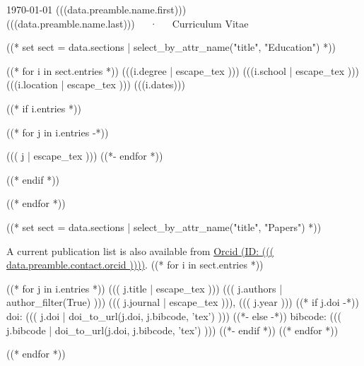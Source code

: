 \documentclass[10pt, letterpaper]{awesome-cv}
\begin{document}
\makecvheader

\makecvfooter
  {\today}
  {(((data.preamble.name.first))) (((data.preamble.name.last)))~~~·~~~Curriculum Vitae}
  {\thepage}



((* set sect = data.sections | select_by_attr_name("title", "Education") *))
\begin{cventries}
((* for i in sect.entries *))
\cventry
  {(((i.degree | escape_tex )))}
  {(((i.school | escape_tex )))}
  {(((i.location | escape_tex )))}
  {(((i.dates)))}
  {((* if i.entries *))
    \begin{cvitems}
    ((* for j in i.entries -*))
    \item ((( j | escape_tex )))
    ((*- endfor *))
    \end{cvitems}
    ((* endif *))}
((* endfor *))
\end{cventries}

((* set  sect = data.sections | select_by_attr_name("title", "Papers") *))

A current publication list is also available from 
\href{https://orcid.org/((( data.preamble.contact.orcid )))}
     {Orcid (ID: ((( data.preamble.contact.orcid ))))}.
((* for i in sect.entries *))
\begin{cventries}
((* for j in i.entries *))
\cventry
  {((( j.title | escape_tex )))}
  {((( j.authors | author_filter(True) )))}
  {((( j.journal | escape_tex ))), ((( j.year )))}
  ((* if j.doi -*))
  {doi: ((( j.doi | doi_to_url(j.doi, j.bibcode, 'tex') )))}
  ((*- else -*))
  {bibcode: ((( j.bibcode | doi_to_url(j.doi, j.bibcode, 'tex') )))}
  ((*- endif *))
  {}
((* endfor *))
\end{cventries}
((* endfor *))
\end{document}
